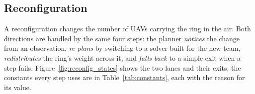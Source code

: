 
\subsection{Reconfiguration}
\label{sec:reconfig}

A reconfiguration changes the number of UAVs carrying the ring in the air. Both directions are handled by the same
four steps: the planner \emph{notices} the change from an observation, \emph{re-plans} by switching to a solver
built for the new team, \emph{redistributes} the ring's weight across it, and \emph{falls back} to a simple exit
when a step fails. Figure~\ref{fig:reconfig_states} shows the two lanes and their exits; the constants every step
uses are in Table~\ref{tab:constants}, each with the reason for its value.

